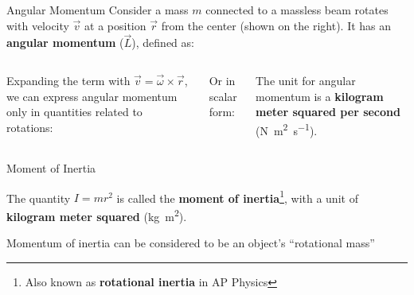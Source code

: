 \documentclass[12pt,compress,aspectratio=169]{beamer}
\begin{document}
\begin{frame}{Angular Momentum}
  Consider a mass $m$ connected to a massless beam rotates with velocity
  $\vec v$ at a position $\vec r$ from the center (shown on the right). It has
  an \textbf{angular momentum} ($\vec L$), defined as:
  \begin{columns}
    

    \vspace{-.1in}Expanding the term with $\vec v=\vec\omega\times\vec r$, we
    can express angular momentum only in quantities related to rotations:

    
    \vspace{-.2in}Or in scalar form:
    

    \vspace{-.2in}The unit for angular momentum is a
    \textbf{kilogram meter squared per second}
    (\si{\newton\metre\squared\per\second}).
    
  \end{columns}
\end{frame}



\begin{frame}{Moment of Inertia}
    
    
  The quantity $I=mr^2$ is called the \textbf{moment of inertia}\footnote{Also
  known as \textbf{rotational inertia} in AP Physics}, with a unit of
  \textbf{kilogram meter squared} (\si{\kilo\gram\metre\squared}).


  \vspace{-.15in}Momentum of inertia can be considered to be an object's
  ``rotational mass''
  \vspace{.3in}
\end{frame}
\end{document}
